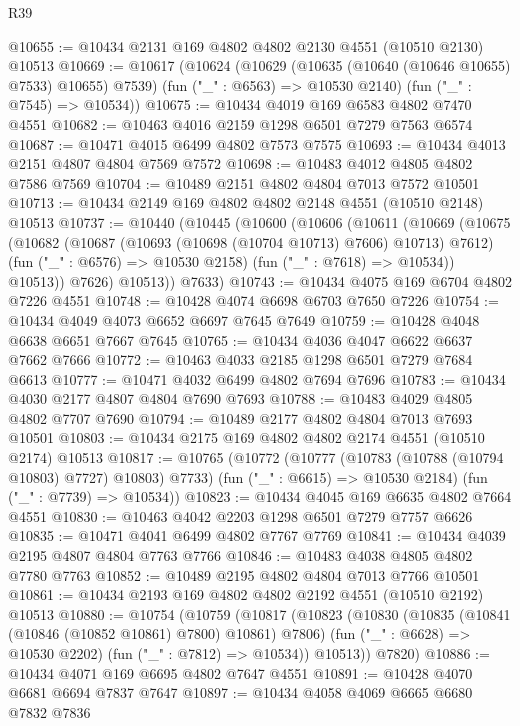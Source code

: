 \begin{lexlean}{R39}
\begin{coremodule}
@10655 := @10434 @2131 @169 @4802 @4802 @2130 @4551 (@10510 @2130) @10513
@10669 := @10617
    (@10624
      (@10629 (@10635 (@10640 (@10646 @10655) @7533) @10655) @7539)
      (fun ("_" : @6563) => @10530 @2140)
      (fun ("_" : @7545) => @10534))
@10675 := @10434 @4019 @169 @6583 @4802 @7470 @4551
@10682 := @10463 @4016 @2159 @1298 @6501 @7279 @7563 @6574
@10687 := @10471 @4015 @6499 @4802 @7573 @7575
@10693 := @10434 @4013 @2151 @4807 @4804 @7569 @7572
@10698 := @10483 @4012 @4805 @4802 @7586 @7569
@10704 := @10489 @2151 @4802 @4804 @7013 @7572 @10501
@10713 := @10434 @2149 @169 @4802 @4802 @2148 @4551 (@10510 @2148) @10513
@10737 := @10440
    (@10445
      (@10600
        (@10606
          (@10611
            (@10669
              (@10675
                (@10682
                  (@10687 (@10693 (@10698 (@10704 @10713) @7606) @10713) @7612)
                  (fun ("_" : @6576) => @10530 @2158)
                  (fun ("_" : @7618) => @10534))
                @10513))
            @7626)
          @10513))
      @7633)
@10743 := @10434 @4075 @169 @6704 @4802 @7226 @4551
@10748 := @10428 @4074 @6698 @6703 @7650 @7226
@10754 := @10434 @4049 @4073 @6652 @6697 @7645 @7649
@10759 := @10428 @4048 @6638 @6651 @7667 @7645
@10765 := @10434 @4036 @4047 @6622 @6637 @7662 @7666
@10772 := @10463 @4033 @2185 @1298 @6501 @7279 @7684 @6613
@10777 := @10471 @4032 @6499 @4802 @7694 @7696
@10783 := @10434 @4030 @2177 @4807 @4804 @7690 @7693
@10788 := @10483 @4029 @4805 @4802 @7707 @7690
@10794 := @10489 @2177 @4802 @4804 @7013 @7693 @10501
@10803 := @10434 @2175 @169 @4802 @4802 @2174 @4551 (@10510 @2174) @10513
@10817 := @10765
    (@10772
      (@10777 (@10783 (@10788 (@10794 @10803) @7727) @10803) @7733)
      (fun ("_" : @6615) => @10530 @2184)
      (fun ("_" : @7739) => @10534))
@10823 := @10434 @4045 @169 @6635 @4802 @7664 @4551
@10830 := @10463 @4042 @2203 @1298 @6501 @7279 @7757 @6626
@10835 := @10471 @4041 @6499 @4802 @7767 @7769
@10841 := @10434 @4039 @2195 @4807 @4804 @7763 @7766
@10846 := @10483 @4038 @4805 @4802 @7780 @7763
@10852 := @10489 @2195 @4802 @4804 @7013 @7766 @10501
@10861 := @10434 @2193 @169 @4802 @4802 @2192 @4551 (@10510 @2192) @10513
@10880 := @10754
    (@10759
      (@10817
        (@10823
          (@10830
            (@10835 (@10841 (@10846 (@10852 @10861) @7800) @10861) @7806)
            (fun ("_" : @6628) => @10530 @2202)
            (fun ("_" : @7812) => @10534))
          @10513))
      @7820)
@10886 := @10434 @4071 @169 @6695 @4802 @7647 @4551
@10891 := @10428 @4070 @6681 @6694 @7837 @7647
@10897 := @10434 @4058 @4069 @6665 @6680 @7832 @7836

\end{coremodule}
\end{lexlean}
